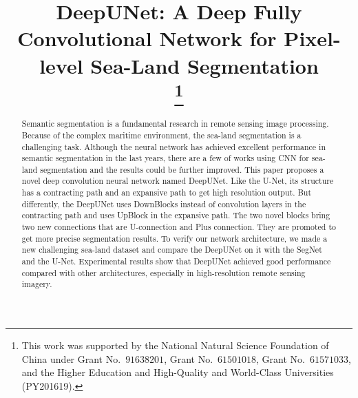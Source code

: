 \documentclass[conference]{IEEEtran}
\begin{document}
\title{DeepUNet: A Deep Fully Convolutional Network for Pixel-level Sea-Land Segmentation\\
\thanks{This work was supported by the National Natural Science Foundation of China under Grant No.~$91638201$, Grant No.~$61501018$, Grant No.~$61571033$, and the Higher Education and High-Quality and World-Class Universities (PY201619).}
}

\author{
}

\maketitle

\begin{abstract}

Semantic segmentation is a fundamental research in remote sensing image processing. Because of the complex maritime environment, the sea-land segmentation is a challenging task.  Although the neural network has achieved excellent performance in semantic segmentation in the last years, there are a few of works using CNN for sea-land segmentation and the results could be further improved. This paper proposes a novel deep convolution neural network named DeepUNet. Like the U-Net, its structure has a contracting path and an expansive path to get high resolution output. But differently, the DeepUNet uses DownBlocks instead of convolution layers in the contracting path and uses UpBlock in the expansive path. The two novel blocks bring two new connections that are U-connection and Plus connection. They are promoted to get more precise segmentation results. To verify our network architecture, we made a new challenging sea-land dataset and compare the DeepUNet on it with the SegNet and the U-Net. Experimental results show that DeepUNet achieved good performance compared with other architectures, especially in high-resolution remote sensing imagery.


\end{abstract}
\end{document}
